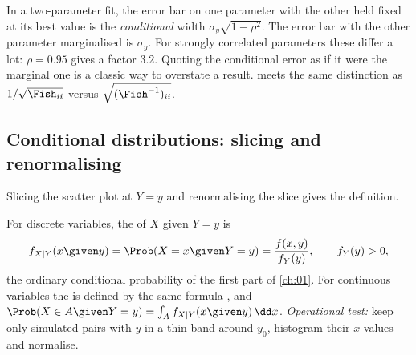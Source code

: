 \begin{pitfall}
In a two-parameter fit, the error bar on one parameter with the other held
fixed at its best value is the \emph{conditional} width
$\sigma_y\sqrt{1-\rho^2}$. The error bar with the other parameter
marginalised is $\sigma_y$. For strongly correlated parameters these differ a
lot: $\rho=0.95$ gives a factor $3.2$. Quoting the conditional error as if it
were the marginal one is a classic way to overstate a result. 
meets the same distinction as $1/\sqrt{\Fish_{ii}}$ versus
$\sqrt{(\Fish^{-1})_{ii}}$.
\end{pitfall}

\subsection{Conditional distributions: slicing and renormalising}

Slicing the scatter plot at $Y=y$ and renormalising the slice gives the
definition.

\begin{workdef}
For discrete variables, the  of $X$ given
$Y=y$ is
\[
  f_{X|Y}(x\given y)=\Prob(X=x\given Y=y)=\frac{f(x,y)}{f_Y(y)},
  \qquad f_Y(y)>0 ,
\]
the ordinary conditional probability of the first part of \cref{ch:01}. For
continuous variables the  is defined by the same
formula , and
$\Prob(X\in A\given Y=y)=\int_Af_{X|Y}(x\given y)\,\dd x$.
\emph{Operational test:} keep only simulated pairs with $y$ in a thin band
around $y_0$, histogram their $x$ values and normalise.
\end{workdef}

